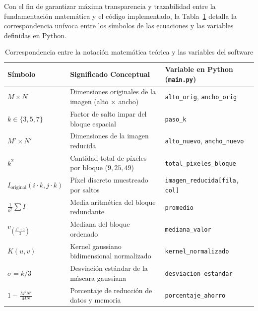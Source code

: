 \documentclass{article}
\begin{document}
Con el fin de garantizar máxima transparencia y trazabilidad entre la fundamentación matemática y el código implementado, la Tabla~\ref{tab:equivalencias} detalla la correspondencia unívoca entre los símbolos de las ecuaciones y las variables definidas en Python.

\begin{table}[H]
    \centering
    \caption{Correspondencia entre la notación matemática teórica y las variables del software}
    \label{tab:equivalencias}
    \small
    \begin{tabularx}{\textwidth}{l >{\raggedright\arraybackslash}p{6.2cm} >{\raggedright\arraybackslash}X}
        \toprule
        \textbf{Símbolo} & \textbf{Significado Conceptual} & \textbf{Variable en Python (\texttt{main.py})} \\
        \midrule
        $M \times N$ & Dimensiones originales de la imagen (alto $\times$ ancho) & \texttt{alto\_orig}, \texttt{ancho\_orig} \\
        $k \in \{3, 5, 7\}$ & Factor de salto impar del bloque espacial & \texttt{paso\_k} \\
        $M' \times N'$ & Dimensiones de la imagen reducida & \texttt{alto\_nuevo}, \texttt{ancho\_nuevo} \\
        $k^2$ & Cantidad total de píxeles por bloque ($9, 25, 49$) & \texttt{total\_pixeles\_bloque} \\
        $I_{\text{original}}(i\cdot k, j\cdot k)$ & Píxel discreto muestreado por saltos & \texttt{imagen\_reducida[fila, col]} \\
        $\frac{1}{k^2} \sum I$ & Media aritmética del bloque redundante & \texttt{promedio} \\
        $v_{\left(\frac{k^2+1}{2}\right)}$ & Mediana del bloque ordenado & \texttt{mediana\_valor} \\
        $K(u, v)$ & Kernel gaussiano bidimensional normalizado & \texttt{kernel\_normalizado} \\
        $\sigma = k/3$ & Desviación estándar de la máscara gaussiana & \texttt{desviacion\_estandar} \\
        $1 - \frac{M'N'}{MN}$ & Porcentaje de reducción de datos y memoria & \texttt{porcentaje\_ahorro} \\
        \bottomrule
    \end{tabularx}
\end{table}

\end{document}
